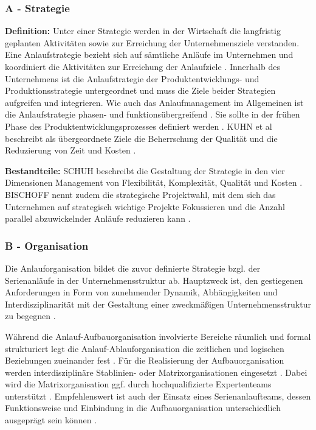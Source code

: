\subsubsection*{A - Strategie}
\textbf{Definition:}
Unter einer Strategie werden in der Wirtschaft die langfristig geplanten Aktivitäten sowie zur Erreichung der Unternehmensziele verstanden. %
Eine Anlaufstrategie bezieht sich auf sämtliche Anläufe im Unternehmen und koordiniert die Aktivitäten zur Erreichung der Anlaufziele \cite[4]{Schuh2008}. Innerhalb des Unternehmens ist die Anlaufstrategie der Produktentwicklungs- und Produktionsstrategie untergeordnet und muss die Ziele beider Strategien aufgreifen und integrieren. %
Wie auch das Anlaufmanagement im Allgemeinen ist die Anlaufstrategie phasen- und funktionsübergreifend \cite{Pfohl2000}. %
Sie sollte in der frühen Phase des Produktentwicklungsprozesses definiert werden \cite{Schuh2004}. 
KUHN et al beschreibt als übergeordnete Ziele die Beherrschung der Qualität und die Reduzierung von Zeit und Kosten \cite[4]{Kuhn2002}. 

\textbf{Bestandteile:}
SCHUH beschreibt die Gestaltung der Strategie in den vier Dimensionen Management von Flexibilität, Komplexität, Qualität und Kosten \cite[13]{Schuh2008}. BISCHOFF nennt zudem die strategische Projektwahl, mit dem sich das Unternehmen auf strategisch wichtige Projekte Fokussieren und die Anzahl parallel abzuwickelnder Anläufe reduzieren kann \cite[43]{Bischoff2007}. 



\subsubsection*{B - Organisation}
Die Anlauforganisation bildet die zuvor definierte Strategie bzgl. der Serienanläufe in der Unternehmensstruktur ab. Hauptzweck ist, den gestiegenen Anforderungen in Form von zunehmender Dynamik, Abhängigkeiten und Interdisziplinarität mit der Gestaltung einer zweckmäßigen Unternehmensstruktur zu begegnen \cite[55]{Schuh2008}. 

Während die Anlauf-Aufbauorganisation involvierte Bereiche räumlich und formal strukturiert legt die Anlauf-Ablauforganisation die zeitlichen und logischen Beziehungen zueinander fest \cite[55]{Schuh2008}.
Für die Realisierung der Aufbauorganisation werden interdisziplinäre Stablinien- oder Matrixorganisationen eingesetzt \cite[77]{Bischoff2007}. Dabei wird die Matrixorganisation ggf. durch hochqualifizierte Expertenteams unterstützt \cite[4]{Schmitt2015}. %
Empfehlenswert ist auch der Einsatz eines Serienanlaufteams, dessen Funktionsweise und Einbindung in die Aufbauorganisation unterschiedlich ausgeprägt sein können \cite[79]{Bischoff2007}. 





